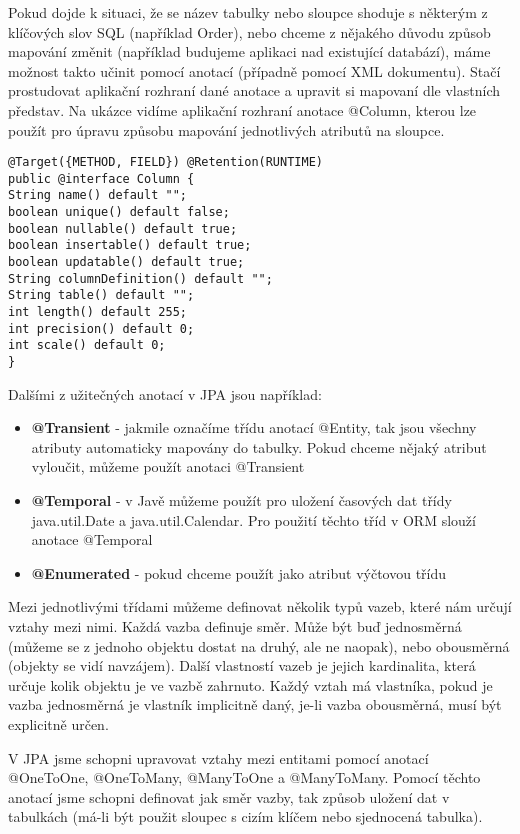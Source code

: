 \documentclass[122pt,oneside]{fithesis}
\begin{document}
Pokud dojde k situaci, že se název tabulky nebo sloupce shoduje s některým z klíčových slov SQL (například Order), nebo chceme z nějakého důvodu způsob mapování změnit (například budujeme aplikaci nad existující databází), máme možnost takto učinit pomocí anotací (případně pomocí XML dokumentu). Stačí prostudovat aplikační rozhraní dané anotace a upravit si mapovaní dle vlastních představ. Na ukázce vidíme aplikační rozhraní anotace @Column, kterou lze použít pro úpravu způsobu mapování jednotlivých atributů na sloupce.

\begin{lstlisting}
@Target({METHOD, FIELD}) @Retention(RUNTIME)
public @interface Column {
String name() default "";
boolean unique() default false;
boolean nullable() default true;
boolean insertable() default true;
boolean updatable() default true;
String columnDefinition() default "";
String table() default "";
int length() default 255;
int precision() default 0;
int scale() default 0; 
}
\end{lstlisting}

Dalšími z užitečných anotací v JPA jsou například:

\begin{itemize}
  \item{\bf @Transient} - jakmile označíme třídu anotací @Entity, tak jsou všechny atributy automaticky mapovány do tabulky. Pokud chceme nějaký atribut vyloučit, můžeme použít anotaci @Transient
  \item{\bf @Temporal} - v Javě můžeme použít pro uložení časových dat třídy java.util.Date a java.util.Calendar. Pro použití těchto tříd v ORM slouží anotace @Temporal
  \item{\bf @Enumerated} - pokud chceme použít jako atribut výčtovou třídu
\end{itemize}

Mezi jednotlivými třídami můžeme definovat několik typů vazeb, které nám určují vztahy mezi nimi. Každá vazba definuje směr. Může být buď jednosměrná (můžeme se z jednoho objektu dostat na druhý, ale ne naopak), nebo obousměrná (objekty se vidí navzájem). Další vlastností vazeb je jejich kardinalita, která určuje kolik objektu je ve vazbě zahrnuto. Každý vztah má vlastníka, pokud je vazba jednosměrná je vlastník implicitně daný, je-li vazba obousměrná, musí být explicitně určen. 

V JPA jsme schopni upravovat vztahy mezi entitami pomocí anotací @OneToOne, @OneToMany, @ManyToOne a @ManyToMany. Pomocí těchto anotací jsme schopni definovat jak směr vazby, tak způsob uložení dat v tabulkách (má-li být použit sloupec s cizím klíčem nebo sjednocená tabulka).
\end{document}
